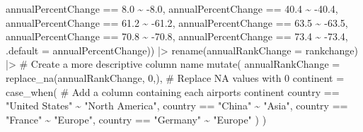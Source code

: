 \documentclass[
  letterpaper,
  DIV=11,
  numbers=noendperiod]{scrartcl}
\newenvironment{Shaded}{\begin{snugshade}}{\end{snugshade}}
\newcommand{\AttributeTok}[1]{\textcolor[rgb]{0.40,0.45,0.13}{#1}}
\newcommand{\CommentTok}[1]{\textcolor[rgb]{0.37,0.37,0.37}{#1}}
\newcommand{\DecValTok}[1]{\textcolor[rgb]{0.68,0.00,0.00}{#1}}
\newcommand{\FloatTok}[1]{\textcolor[rgb]{0.68,0.00,0.00}{#1}}
\newcommand{\FunctionTok}[1]{\textcolor[rgb]{0.28,0.35,0.67}{#1}}
\newcommand{\NormalTok}[1]{\textcolor[rgb]{0.00,0.23,0.31}{#1}}
\newcommand{\SpecialCharTok}[1]{\textcolor[rgb]{0.37,0.37,0.37}{#1}}
\newcommand{\StringTok}[1]{\textcolor[rgb]{0.13,0.47,0.30}{#1}}
\begin{document}
\begin{Shaded}
\begin{Highlighting}[]
\NormalTok{      annualPercentChange }\SpecialCharTok{==} \FloatTok{8.0} \SpecialCharTok{\textasciitilde{}} \SpecialCharTok{{-}}\FloatTok{8.0}\NormalTok{,}
\NormalTok{      annualPercentChange }\SpecialCharTok{==} \FloatTok{40.4} \SpecialCharTok{\textasciitilde{}} \SpecialCharTok{{-}}\FloatTok{40.4}\NormalTok{,}
\NormalTok{      annualPercentChange }\SpecialCharTok{==} \FloatTok{61.2} \SpecialCharTok{\textasciitilde{}} \SpecialCharTok{{-}}\FloatTok{61.2}\NormalTok{,}
\NormalTok{      annualPercentChange }\SpecialCharTok{==} \FloatTok{63.5} \SpecialCharTok{\textasciitilde{}} \SpecialCharTok{{-}}\FloatTok{63.5}\NormalTok{,}
\NormalTok{      annualPercentChange }\SpecialCharTok{==} \FloatTok{70.8} \SpecialCharTok{\textasciitilde{}} \SpecialCharTok{{-}}\FloatTok{70.8}\NormalTok{,}
\NormalTok{      annualPercentChange }\SpecialCharTok{==} \FloatTok{73.4} \SpecialCharTok{\textasciitilde{}} \SpecialCharTok{{-}}\FloatTok{73.4}\NormalTok{,}
      \AttributeTok{.default =}\NormalTok{ annualPercentChange)) }\SpecialCharTok{|\textgreater{}}
  \FunctionTok{rename}\NormalTok{(}\AttributeTok{annualRankChange =}\NormalTok{ rankchange) }\SpecialCharTok{|\textgreater{}} 
  \CommentTok{\# Create a more descriptive column name}
  \FunctionTok{mutate}\NormalTok{(}
    \AttributeTok{annualRankChange =} \FunctionTok{replace\_na}\NormalTok{(annualRankChange, }\DecValTok{0}\NormalTok{,), }
    \CommentTok{\# Replace NA values with 0}
    \AttributeTok{continent =} \FunctionTok{case\_when}\NormalTok{( }\CommentTok{\# Add a column containing each airport\textquotesingle{}s continent}
\NormalTok{      country }\SpecialCharTok{==} \StringTok{"United States"} \SpecialCharTok{\textasciitilde{}} \StringTok{"North America"}\NormalTok{,}
\NormalTok{      country }\SpecialCharTok{==} \StringTok{"China"} \SpecialCharTok{\textasciitilde{}} \StringTok{"Asia"}\NormalTok{,}
\NormalTok{      country }\SpecialCharTok{==} \StringTok{"France"} \SpecialCharTok{\textasciitilde{}} \StringTok{"Europe"}\NormalTok{,}
\NormalTok{      country }\SpecialCharTok{==} \StringTok{"Germany"} \SpecialCharTok{\textasciitilde{}} \StringTok{"Europe"}
\NormalTok{    )}
\NormalTok{  )}


\end{Highlighting}
\end{Shaded}
\end{document}
